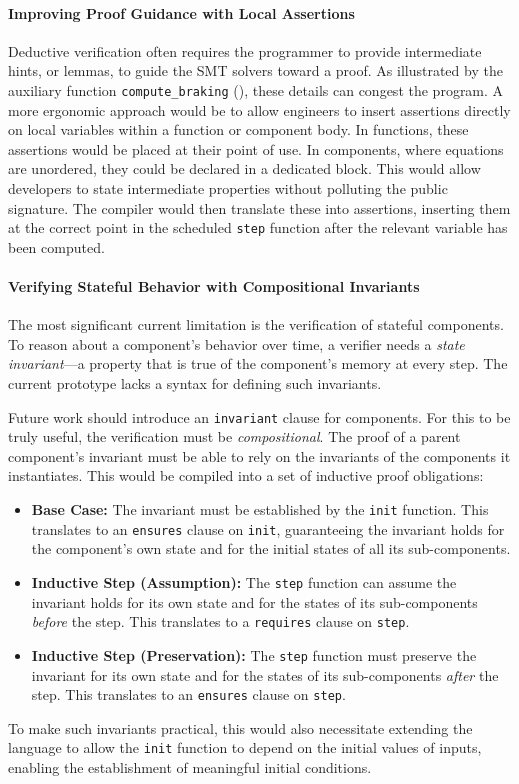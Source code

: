 \paragraph{Improving Proof Guidance with Local Assertions}
Deductive verification often requires the programmer to provide intermediate hints, or lemmas, to
guide the SMT solvers toward a proof. As illustrated by the auxiliary function \verb|compute_braking|
(), these details can congest the program. A more
ergonomic approach would be to allow engineers to insert assertions directly on local variables
within a function or component body. In functions, these assertions would be placed at their point
of use. In components, where equations are unordered, they could be declared in a dedicated block.
This would allow developers to state intermediate properties without polluting the public signature.
The compiler would then translate these into \Creusot assertions, inserting them at the correct
point in the scheduled \texttt{step} function after the relevant variable has been computed.

\paragraph{Verifying Stateful Behavior with Compositional Invariants}
The most significant current limitation is the verification of stateful components. To reason about
a component's behavior over time, a verifier needs a \emph{state invariant}---a property that is
true of the component's memory at every step. The current prototype lacks a syntax for defining such
invariants.

Future work should introduce an \texttt{invariant} clause for components. For this to be truly
useful, the verification must be \emph{compositional}. The proof of a parent component's invariant
must be able to rely on the invariants of the components it instantiates. This would be compiled
into a set of inductive proof obligations:
\begin{itemize}
    \item \textbf{Base Case:} The invariant must be established by the \texttt{init} function. This
          translates to an \texttt{ensures} clause on \texttt{init}, guaranteeing the invariant
          holds for the component's own state and for the initial states of all its sub-components.
    \item \textbf{Inductive Step (Assumption):} The \texttt{step} function can assume the invariant
          holds for its own state and for the states of its sub-components \emph{before} the step.
          This translates to a \texttt{requires} clause on \texttt{step}.
    \item \textbf{Inductive Step (Preservation):} The \texttt{step} function must preserve the
          invariant for its own state and for the states of its sub-components \emph{after} the
          step. This translates to an \texttt{ensures} clause on \texttt{step}.
\end{itemize}
To make such invariants practical, this would also necessitate extending the \GRust language to
allow the \texttt{init} function to depend on the initial values of inputs, enabling the
establishment of meaningful initial conditions.

